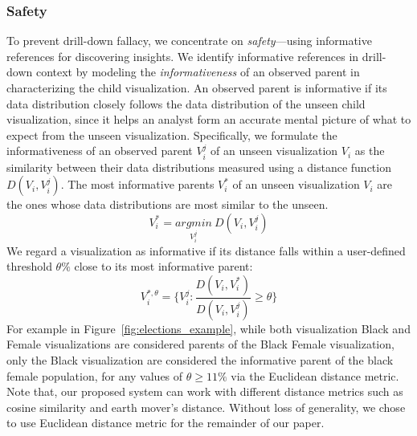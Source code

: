 \subsubsection{Safety}
To prevent drill-down fallacy, we concentrate on \emph{safety}---using informative references for discovering insights. We identify informative references in drill-down context by modeling the \emph{informativeness} of an observed parent in characterizing the child visualization. An observed parent is informative if its data distribution closely follows the data distribution of the unseen child visualization, since it helps an analyst form an accurate mental picture of what to expect from the unseen visualization. Specifically, we formulate the informativeness of an observed parent $V_i^j$ of an unseen visualization $V_i$ as the similarity between their data distributions measured using a distance function $D(V_i, V_i^j)$. The most informative parents $V_i^*$ of an unseen visualization $V_i$ are the ones whose data distributions are most similar to the unseen.
\begin{equation}
    V_i^*=\underset{V_i^j}{argmin}\ D(V_i, V_i^j)
\end{equation}
We regard a visualization as informative if its distance falls within a user-defined threshold $\theta\%$ close to its most informative parent:
\begin{equation}
    V_i^{*, \theta} = \{V_i^j : \frac{D(V_i, V_i^*)}{D(V_i, V_i^j)} \geq \theta\}
\end{equation}
For example in Figure~\ref{fig:elections_example}, while both visualization Black and Female visualizations are considered parents of the Black Female visualization, only the Black visualization are considered the informative parent of the black female population, for any values of $\theta \geq 11\%$ via the Euclidean distance metric. Note that, our proposed system can work with different distance metrics such as cosine similarity and earth mover's distance. Without loss of generality, we chose to use Euclidean distance metric for the remainder of our paper.

